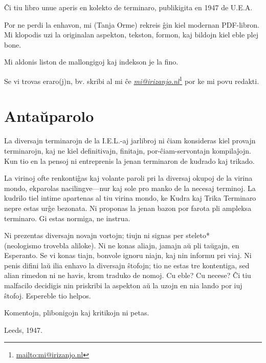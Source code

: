 \newpage

\newpage\vspace*{\fill}
\thispagestyle{empty}

Ĉi tiu libro unue aperis en kolekto de terminaro, publikigita en 1947 de U.E.A.

Por ne perdi la enhavon, mi (Tanja Orme) rekreis ĝin kiel modernan PDF-libron. Mi klopodis uzi la originalan aspekton, tekston, formon, kaj bildojn kiel eble plej bone.

Mi aldonis liston de mallongigoj kaj indekson je la fino.

Se vi trovas eraro(j)n, bv. skribi al mi ĉe \href{mailto:mi@irizanjo.nl}{\emph{mi@irizanjo.nl}}\footnote{\href{mailto:mi@irizanjo.nl}{mailto:mi@irizanjo.nl}} por ke mi povu redakti.

\newpage

\section[Antaŭparolo]{Antaŭparolo}
\hypertarget{Antaŭparolo}{}
\label{Antaŭparolo}


\thispagestyle{empty}

La diversajn terminarojn de la I.E.L.-aj jarlibroj ni ĉiam konsideras kiel provajn terminarojn, kaj ne kiel definitivajn, finitajn, por-ĉiam-servontajn kompilaĵojn. Kun tio en la pensoj ni entreprenis la jenan terminaron de kudrado kaj trikado.

La virinoj ofte renkontiĝas kaj volante paroli pri la diversaj okupoj de la virina mondo, ekparolas nacilingve---nur kaj sole pro manko de la necesaj terminoj. La kudrilo tiel intime apartenas al tiu virina mondo, ke Kudra kaj Trika Terminaro nepre estas urĝe bezonata. Ni proponas la jenan bazon por farota pli ampleksa terminaro. Gi estas normiga, ne instrua.

Ni prezentas diversajn novajn vortojn; tiujn ni signas per steleto* \\(\dagger \space neologismo trovebla aliloke). Ni ne konas aliajn, jamajn aŭ pli taŭgajn, en Esperanto. Se vi konas tiajn, bonvole ignoru niajn, kaj nin informu pri viaj. Ni penis difini laŭ ilia enhavo la diversajn ŝtofojn; tio ne estas tre kontentiga, sed alian rimedon ni ne havis, krom traduko de nomoj. Cu eble? Cu necese? Ĉi tiu malfacilo decidigis nin priskribi la aspekton aŭ la uzojn en nia lando por iuj ŝtofoj. Espereble tio helpos.

Komentojn, plibonigojn kaj kritikojn ni petas.

Leeds, 1947.


